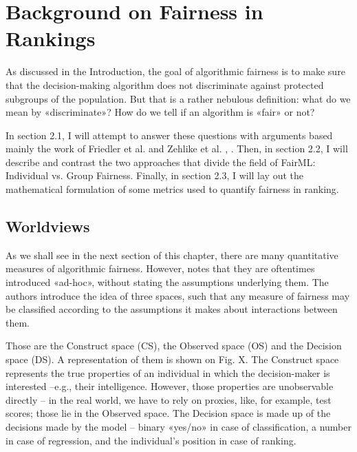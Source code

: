 
	
\newcommand{\ind}{\perp \!\!\! \perp}
\newcommand{\exposure}[1]{\textrm{Exposure}(#1|\mathbf{P})}

\chapter{Background on Fairness in Rankings}\label{chapt:background}


As discussed in the Introduction, the goal of algorithmic fairness is to make sure that the decision-making algorithm does not discriminate against protected subgroups of the population. But that is a rather nebulous definition: what do we mean by «discriminate»? How do we tell if an algorithm is «fair» or not?

In section 2.1, I will attempt to answer these questions with arguments based mainly the work of Friedler et al. and Zehlike et al. \cite{3533379}, \cite{3533380}. Then, in section 2.2, I will describe and contrast the two approaches that divide the field of FairML: Individual vs. Group Fairness. Finally, in section 2.3, I will lay out the mathematical formulation of some metrics used to quantify fairness in ranking.

\section{Worldviews}\label{sect:1_1}

As we shall see in the next section of this chapter, there are many quantitative measures of algorithmic fairness. However, \cite{1609.07236} notes that they are oftentimes introduced «ad-hoc», without stating the assumptions underlying them. The authors introduce the idea of three spaces, such that any measure of fairness may be classified according to the assumptions it makes about interactions between them.

Those are the Construct space (CS), the Observed space (OS) and the Decision space (DS). A representation of them is shown on Fig. X. The Construct space  represents the true properties of an individual in which the decision-maker is interested –e.g., their intelligence. However, those properties are unobservable directly – in the real world, we have to rely on proxies, like, for example, test scores; those lie in the Observed space. The Decision space is made up of the decisions made by the model – binary «yes/no» in case of classification, a number in case of regression, and the individual’s position in case of ranking.


